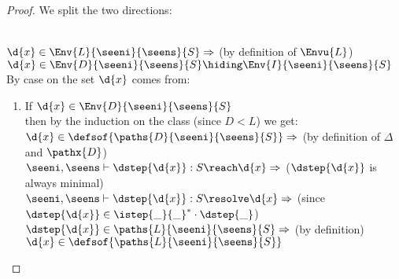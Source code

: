 \begin{proof}
\noindent {} 
We split the two directions:

 \\
$\d{x} \in \Env{L}{\seeni}{\seens}{S} \Rightarrow$ (by definition of $\Envu{L}$) \\
$\d{x} \in \Env{D}{\seeni}{\seens}{S} \hiding \Env{I}{\seeni}{\seens}{S}$\\
By case on the set $\d{x}$ comes from:
\begin{enumerate}
 \item If $\d{x} \in \Env{D}{\seeni}{\seens}{S}$ \\
 then by the induction on the class (since $D < L$) we get:\\
 $\d{x} \in \defsof{\paths{D}{\seeni}{\seens}{S}} \Rightarrow$ (by definition of $\Delta$ and $\pathx{D}$)\\
 $\seeni,\seens \vdash \dstep{\d{x}} : S \reach \d{x} \Rightarrow$ ($\dstep{\d{x}}$ is always minimal)\\ 
 $\seeni,\seens \vdash \dstep{\d{x}} : S \resolve \d{x} \Rightarrow$ (since $\dstep{\d{x}} \in \istep{\_}{\_}^*\cdot \dstep{\_}$)\\
 $\dstep{\d{x}} \in \paths{L}{\seeni}{\seens}{S}\Rightarrow$ (by definition)
 $\d{x} \in \defsof{\paths{L}{\seeni}{\seens}{S}}$
 \smallskip


\end{enumerate}
\end{proof}
